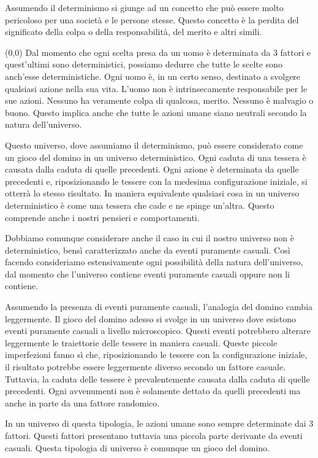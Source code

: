 \documentclass[a4paper, 12pt]{article}
\newcommand{\ownright}[0]{%
    \makebox(0,0){
        \stackon[8pt]{\phantom{A}}{
            \begin{tikzpicture}
                \fill (0,0) -- (0,0.3) -- ++(0.05,0) -- (0.05,0);
                \fill (0,0.3) -- ++(0.3,0) -- (0.3,0.25) -- (0.05,0.25);
            \end{tikzpicture}
        }
    }%
}
\begin{document}
Assumendo il determinismo si giunge ad un concetto che può essere molto pericoloso per una società
e le persone stesse. Questo concetto è la perdita del significato della colpa o della responsabilità, del merito e altri simili.

\ownright{}%
Dal momento che ogni scelta presa
da un uomo è determinata da 3 fattori e
quest'ultimi sono deterministici, possiamo
dedurre che tutte le scelte sono
anch'esse deterministiche.
Ogni uomo è, in un certo senso, destinato a
svolgere qualsiasi azione nella sua vita.
L'uomo non è intrinsecamente responsabile
per le sue azioni. Nessuno ha veramente colpa di qualcosa,
merito. Nessuno è malvagio o buono. Questo
implica anche che tutte le azioni umane siano
neutrali secondo la natura dell'universo.

Questo universo, dove assumiamo il determinismo, può essere considerato come un gioco del domino in un universo deterministico.
Ogni caduta di una tessera è causata dalla caduta di quelle precedenti. Ogni azione è determinata da quelle precedenti
e, riposizionando le tessere con la medesima configurazione
iniziale, si otterrà lo stesso risultato.
In maniera equivalente qualsiasi cosa in un 
universo deterministico è come una tessera che cade
e ne spinge un'altra. Questo comprende anche i nostri
pensieri e comportamenti.

Dobbiamo comunque considerare anche il caso in cui
il nostro universo non è deterministico, bensì
caratterizzato anche da eventi puramente casuali.
Così facendo consideriamo estensivamente ogni possibilità
della natura dell'universo, dal momento che
l'universo contiene eventi puramente casuali oppure
non li contiene.

Assumendo la presenza di eventi puramente casuali,
l'analogia del domino cambia leggermente.
Il gioco del domino adesso si svolge in un universo
dove esistono eventi puramente casuali a livello microscopico.
Questi eventi potrebbero alterare leggermente
le traiettorie delle tessere in maniera casuali.
Queste piccole imperfezioni fanno sì che,
riposizionando le tessere con la configurazione iniziale,
il risultato potrebbe essere leggermente diverso
secondo un fattore casuale. Tuttavia,
la caduta delle tessere è prevalentemente
causata dalla caduta di quelle precedenti.
Ogni avvenumenti non è solamente dettato da quelli precedenti
ma anche in parte da una fattore randomico.

In un universo di questa tipologia, le azioni umane
sono sempre determinate dai 3 fattori.
Questi fattori presentano tuttavia una piccola
parte derivante da eventi casuali.
Questa tipologia di universo è comunque un gioco
del domino.
\end{document}
